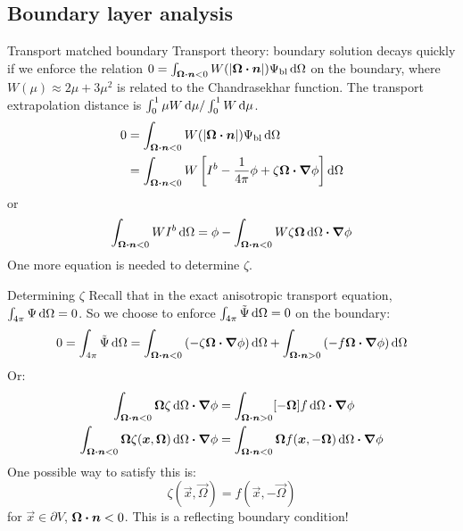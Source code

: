 \documentclass{beamer}
\begin{document}
\subsection{Boundary layer analysis}
\begin{frame}{Transport matched boundary}
  Transport theory: boundary solution decays quickly if we enforce the relation
  $0 = \int_{\bm{\Omega}\bm{\cdot} \bm{n} < 0} W(\left| \bm{\Omega}\bm{\cdot} \bm{n} \right|)
  \Psi_\mathrm{bl} \mathop{}\!\mathrm{d}\Omega$ on the boundary, where $W(\mu) \approx 2 \mu + 3
  \mu^2$ is related to the Chandrasekhar function. The transport extrapolation
  distance is $\int_0^1 \mu W \mathop{}\!\mathrm{d} \mu / \int_0^1 W \mathop{}\!\mathrm{d} \mu$.
  \begin{align*}
  0
  &= \int_{\bm{\Omega}\bm{\cdot} \bm{n} < 0} W(\left| \bm{\Omega}\bm{\cdot} \bm{n} \right|)
  \Psi_\mathrm{bl} \mathop{}\!\mathrm{d}\Omega
  \\
  &= \int_{\bm{\Omega}\bm{\cdot} \bm{n} < 0} W \left[ I^b
  - \frac{1}{4\pi} \phi
  + \zeta \bm{\Omega} \bm{\cdot} \bm{\nabla} \phi \right] \mathop{}\!\mathrm{d}\Omega
  \end{align*}
  or
  \begin{equation} \label{eq:loBndy}
  \int_{\bm{\Omega}\bm{\cdot} \bm{n} < 0} W I^b \mathop{}\!\mathrm{d}\Omega
  = \phi - \int_{\bm{\Omega}\bm{\cdot} \bm{n} < 0} W \zeta \bm{\Omega} \mathop{}\!\mathrm{d}\Omega
  \bm{\cdot} \bm{\nabla} \phi
  \end{equation}
  One more equation is needed to determine $\zeta$.
\end{frame}

\begin{frame}{Determining $\zeta$}
 Recall that in the exact anisotropic transport equation,
 $\int_{4\pi}\Psi\mathop{}\!\mathrm{d}\Omega = 0$. So we choose to
 enforce $\int_{4\pi}\tilde\Psi\mathop{}\!\mathrm{d}\Omega = 0$ on the boundary:
 \begin{equation*}
   0 = \int_{4\pi} \tilde\Psi\mathop{}\!\mathrm{d}\Omega
   = \int_{\bm{\Omega}\bm{\cdot} \bm{n} < 0} \left(
   -\zeta\bm{\Omega}\bm{\cdot} \bm{\nabla} \phi \right)\mathop{}\!\mathrm{d}\Omega
   + \int_{\bm{\Omega}\bm{\cdot} \bm{n} > 0} \left(
   - f \bm{\Omega}\bm{\cdot} \bm{\nabla} \phi \right)\mathop{}\!\mathrm{d}\Omega
 \end{equation*}
 Or:
 \begin{align*}
   \int_{\bm{\Omega}\bm{\cdot} \bm{n} < 0}\bm{\Omega} \zeta\mathop{}\!\mathrm{d}\Omega
   \bm{\cdot} \bm{\nabla} \phi
   &= \int_{\bm{\Omega}\bm{\cdot} \bm{n} > 0} [-\bm{\Omega}]f \mathop{}\!\mathrm{d}\Omega
   \bm{\cdot} \bm{\nabla} \phi
   \\
   \int_{\bm{\Omega}\bm{\cdot} \bm{n} < 0} \bm{\Omega}
   \zeta(\bm{x}, \bm{\Omega}) \mathop{}\!\mathrm{d}\Omega \bm{\cdot} \bm{\nabla} \phi
   &= \int_{\bm{\Omega}\bm{\cdot} \bm{n} < 0}\bm{\Omega}
   f(\bm{x}, -\bm{\Omega}) \mathop{}\!\mathrm{d}\Omega \bm{\cdot} \bm{\nabla} \phi
 \end{align*}
 One possible way to satisfy this is:
 \begin{equation*}
   \zeta(\vec{x}, \vec{\Omega}) = f(\vec{x}, -\vec{\Omega}) 
 \end{equation*}
 for $\vec{x} \in \partial V$, $\bm{\Omega}\bm{\cdot} \bm{n} < 0$. This is a
 reflecting boundary condition!
\end{frame}
\end{document}
